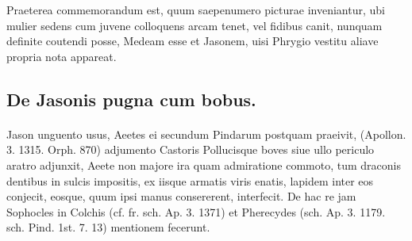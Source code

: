 \documentclass[a4paper, 11pt, oneside, polutonikogreek, german]{article}
\begin{document}
Praeterea commemorandum est, quum saepenumero picturae inveniantur, ubi mulier sedens cum juvene colloquens arcam tenet, vel fidibus canit, nunquam definite coutendi posse, Medeam esse et Jasonem, uisi Phrygio vestitu aliave propria nota appareat.

\subsection{De Jasonis pugna cum bobus.}
\paragraph{}
Jason unguento usus, Aeetes ei secundum Pindarum postquam praeivit, (Apollon. 3. 1315. Orph. 870) adjumento Castoris Pollucisque boves siue ullo periculo aratro adjunxit, Aeete non majore ira quam admiratione commoto, tum draconis dentibus in sulcis impositis, ex iisque armatis viris enatis, lapidem inter eos conjecit, eosque, quum ipsi manus consererent, interfecit. De hac re jam Sophocles in Colchis (cf. fr. sch. Ap. 3. 1371) et Pherecydes (sch. Ap. 3. 1179. sch. Pind. 1st. 7. 13) mentionem fecerunt.
\end{document}
